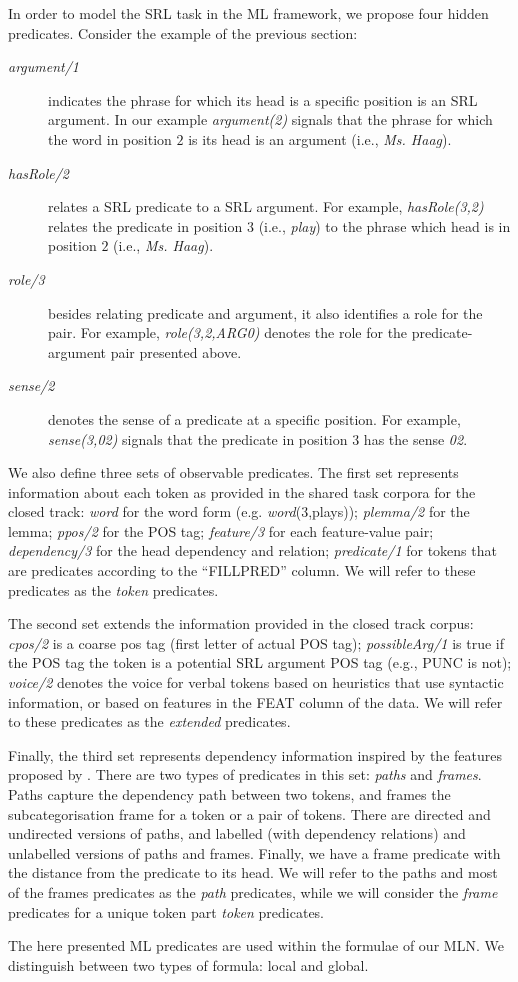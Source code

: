 
In order to model the SRL task in the ML framework, we propose four hidden 
predicates. Consider the example of the previous section:
\begin{description}
    \item [\emph{argument/1}] indicates the phrase for which its head is a 
        specific position is an SRL argument. In our example     
        \emph{argument(2)} signals that the phrase for which the word in 
        position $2$ is its head is an argument (i.e., \emph{Ms. Haag}).
    \item [\emph{hasRole/2}] relates a SRL predicate to a SRL argument. For example, \emph{hasRole(3,2)} relates the
        predicate in position $3$ (i.e., \emph{play}) to the phrase which head 
        is in position $2$ (i.e., \emph{Ms. Haag}).
    \item [\emph{role/3}] besides relating predicate and argument, it also
        identifies a role for the pair. For example,
        \emph{role(3,2,ARG0)} denotes the role for the predicate-argument pair 
        presented above.
    \item [\emph{sense/2}] denotes the sense of a predicate at a
        specific position. For example, \emph{sense(3,02)}
        signals that the predicate in position $3$ has the sense \emph{02}.
\end{description}

We also define three sets of observable predicates. The first set represents information about each token as provided in the shared task corpora for the closed track:  \emph{word} for the word form (e.g. \emph{word}(3,plays)); \emph{plemma/2} for the 
lemma; \emph{ppos/2} for the POS tag; \emph{feature/3} for each feature-value 
pair; \emph{dependency/3} for the head dependency and relation; 
\emph{predicate/1} for tokens that are predicates according to the ``FILLPRED'' column. We will refer to these 
predicates as the \emph{token} predicates. 

The second set extends the information provided in the closed track corpus: 
\emph{cpos/2} is a coarse pos tag (first letter of actual POS tag); \emph{possibleArg/1} is true if the POS tag the token is a potential SRL argument  POS tag (e.g., PUNC is not); \emph{voice/2} denotes the voice for verbal tokens based on heuristics that use
syntactic information, or based on features in the FEAT column of the data. We will 
refer to these predicates as the \emph{extended} predicates.

Finally, the third set represents dependency information inspired by the features proposed by \citet{xue04calibrating}. There are two types of 
predicates in this set: \emph{paths} and \emph{frames}.  Paths capture the 
dependency path between two tokens, and frames the subcategorisation frame for a 
token or a pair of tokens. There are directed and 
undirected versions of paths, and labelled  (with dependency relations) and unlabelled versions of paths and frames. Finally, we have a frame predicate with the distance from the 
predicate to its head.  We will refer to the paths and most of the frames 
predicates as the \emph{path} predicates, while we will consider the 
\emph{frame} predicates for a unique token part \emph{token} predicates.

The here presented ML predicates are used within the formulae of our MLN.  We 
distinguish between two types of formula: local and global. 
